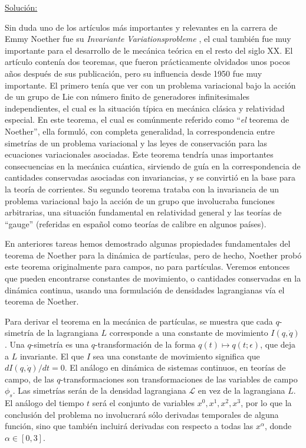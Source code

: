 \documentclass[a4paper,10pt]{article}
\numberwithin{equation}{section}
\begin{document}
\underline{Solución:} \vspace{.3cm}

Sin duda uno de los artículos más importantes y relevantes en la carrera de 
Emmy Noether fue su \emph{Invariante Variationsprobleme} \cite{noether}, el cual también 
fue muy importante para el desarrollo de le mecánica teórica en el resto del siglo 
XX. El artículo contenía dos teoremas, que fueron prácticamente olvidados unos pocos 
años después de sus publicación, pero su influencia desde 1950 fue muy importante. 
El primero tenía que ver con un problema variacional bajo la acción de un grupo de 
Lie con número finito de generadores infinitesimales independientes, el cual es 
la situación típica en mecánica clásica y relatividad especial. En este teorema, 
el cual es comúnmente referido como ``\emph{el} teorema de Noether'', ella formuló, 
con completa generalidad, la correspondencia entre simetrías de un problema variacional 
y las leyes de conservación para las ecuaciones variacionales asociadas. Este teorema 
tendría unas importantes consecuencias en la mecánica cuántica, sirviendo de guía 
en la correspondencia de cantidades conservadas asociadas con invariancias, y se 
convirtió en la base para la teoría de corrientes. Su segundo teorema trataba con 
la invariancia de un problema variacional bajo la acción de un grupo que involucraba 
funciones arbitrarias, una situación fundamental en relatividad general y las 
teorías de ``gauge'' (referidas en español como teorías de calibre en algunos países).

\vspace{.3cm}

En anteriores tareas hemos demostrado algunas propiedades fundamentales del teorema de 
Noether para la dinámica de partículas, pero de hecho, Noether probó este teorema 
originalmente para campos, no para partículas. Veremos entonces que pueden encontrarse 
constantes de movimiento, o cantidades conservadas en la dinámica continua, usando 
una formulación de densidades lagrangianas vía el teorema de Noether.

\vspace{.3cm}

Para derivar el teorema en la mecánica de partículas, se muestra que cada $q$-simetría 
de la lagrangiana $L$ corresponde a una constante de movimiento $I(q,\dot{q})$. Una 
$q$-simetría es una $q$-transformación de la forma $q(t) \mapsto q(t;\epsilon)$, que 
deja a $L$ invariante. El que $I$ sea una constante de movimiento significa que 
$dI(q,\dot{q})/dt = 0$. El análogo en dinámica de sistemas continuos, en teorías 
de campo, de las $q$-transformaciones son transformaciones de las variables de 
campo $\phi_s$. Las simetrías serán de la densidad lagrangiana $\mathcal{L}$ en vez 
de la lagrangiana $L$. El análogo del tiempo $t$ será el conjunto de variables 
$x^0, x^1, x^2, x^3$, por lo que la conclusión del problema no involucrará sólo 
derivadas temporales de alguna función, sino que también incluirá derivadas con 
respecto a todas las $x^\alpha$, donde $\alpha \in [0,3]$. 
\end{document}
